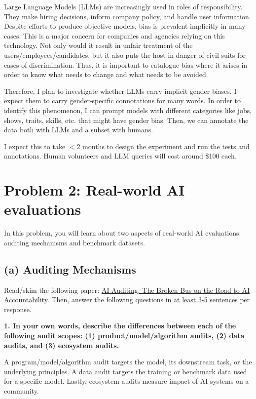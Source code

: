 \documentclass{article}
\begin{document}
\bigskip
\begin{mdframed}

    Large Language Models (LLMs) are increasingly used in roles of responsibility. They make hiring decisions, inform company policy, and 
    handle user information. Despite efforts to produce objective models, bias is prevalent implicitly in many cases. This is a major concern for
    companies and agencies relying on this technology. Not only would it result in unfair treatment of the users/employees/candidates, but it also puts the host 
    in danger of civil suits for cases of discrimination. Thus, it is important to catalogue bias where it arises in order to know what needs to change and what needs 
    to be avoided. 

    Therefore, I plan to investigate whether LLMs carry implicit gender biases. I expect them to carry gender-specific connotations for many words. In order to 
    identify this phenomenon, I can prompt models with different categories like jobs, shows, traits, skills, etc. that might have gender bias. Then, we can annotate the data both with 
    LLMs and a subset with humans. 

    I expect this to take $<2$ months to design the experiment and run the tests and annotations. Human volunteers and LLM queries will cost around \$100 each.


\end{mdframed}
\bigskip

  

\section*{Problem 2: Real-world AI evaluations}

In this problem, you will learn about two aspects of real-world AI evaluations: auditing mechanisms and benchmark datasets. 

\subsection*{(a) Auditing Mechanisms}

Read/skim the following paper: \href{https://arxiv.org/pdf/2401.14462}{AI Auditing: The Broken Bus on the Road to AI Accountability}. Then, answer the following questions in \underline{at least 3-5 sentences} per response.

\textbf{1. In your own words, describe the differences between each of the following audit scopes: (1) product/model/algorithm audits, (2) data audits, and (3) ecosystem audits.}
\bigskip
\begin{mdframed}

    A program/model/algorithm audit targets the model, its downstream task, or the underlying principles. A data audit targets the
    training or benchmark data used for a specific model. Lastly, ecosystem audits measure impact of AI systems on a community.

\end{mdframed}
\bigskip
\end{document}
